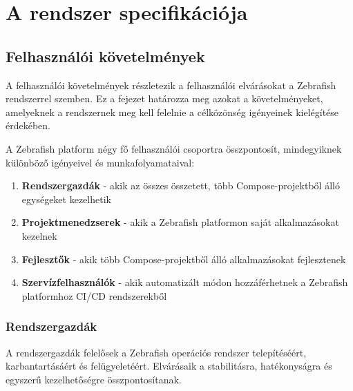\chapter{A rendszer specifikációja} \label{chapter2}

\section{Felhasználói követelmények}

A felhasználói követelmények részletezik a felhasználói elvárásokat a Zebrafish rendszerrel szemben. Ez a fejezet határozza meg azokat a követelményeket, amelyeknek a rendszernek meg kell felelnie a célközönség igényeinek kielégítése érdekében.

A Zebrafish platform négy fő felhasználói csoportra összpontosít, mindegyiknek különböző igényeivel és munkafolyamataival:

\begin{enumerate}
  \item \textbf{Rendszergazdák} - akik az összes összetett, több Compose-projektből álló egységeket kezelhetik
  \item \textbf{Projektmenedzserek} - akik a Zebrafish platformon saját alkalmazásokat kezelnek
  \item \textbf{Fejlesztők} - akik több Compose-projektből álló alkalmazásokat fejlesztenek
  \item \textbf{Szervízfelhasználók} - akik automatizált módon hozzáférhetnek a Zebrafish platformhoz CI/CD rendszerekből
\end{enumerate}

\subsection{Rendszergazdák}

A rendszergazdák felelősek a Zebrafish operációs rendszer telepítéséért, karbantartásáért és felügyeletéért. Elvárásaik a stabilitásra, hatékonyságra és egyszerű kezelhetőségre összpontosítanak.

